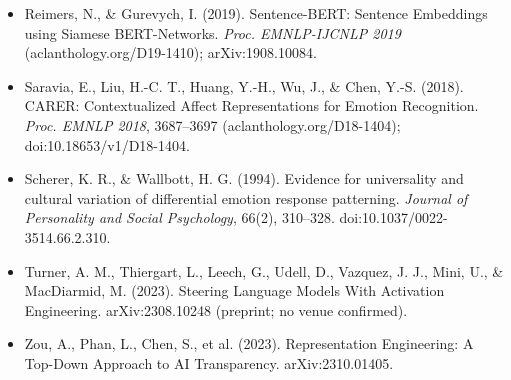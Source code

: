 \documentclass[
  10pt,
]{article}
\begin{document}
\begin{itemize}
  Hubinger, E., \& Turner, A. M. (2024). Steering Llama 2 via
  Contrastive Activation Addition. \emph{Proc. ACL 2024}
  (aclanthology.org/2024.acl-long.828); arXiv:2312.06681 (first posted
  2023).
\item
  Reimers, N., \& Gurevych, I. (2019). Sentence-BERT: Sentence
  Embeddings using Siamese BERT-Networks. \emph{Proc. EMNLP-IJCNLP 2019}
  (aclanthology.org/D19-1410); arXiv:1908.10084.
\item
  Saravia, E., Liu, H.-C. T., Huang, Y.-H., Wu, J., \& Chen, Y.-S.
  (2018). CARER: Contextualized Affect Representations for Emotion
  Recognition. \emph{Proc. EMNLP 2018}, 3687--3697
  (aclanthology.org/D18-1404); doi:10.18653/v1/D18-1404.
\item
  Scherer, K. R., \& Wallbott, H. G. (1994). Evidence for universality
  and cultural variation of differential emotion response patterning.
  \emph{Journal of Personality and Social Psychology}, 66(2), 310--328.
  doi:10.1037/0022-3514.66.2.310.
\item
  Turner, A. M., Thiergart, L., Leech, G., Udell, D., Vazquez, J. J.,
  Mini, U., \& MacDiarmid, M. (2023). Steering Language Models With
  Activation Engineering. arXiv:2308.10248 (preprint; no venue
  confirmed).
\item
  Zou, A., Phan, L., Chen, S., et al. (2023). Representation
  Engineering: A Top-Down Approach to AI Transparency. arXiv:2310.01405.
\end{itemize}
\end{document}

